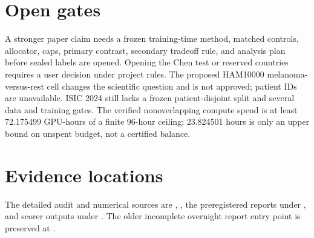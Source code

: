 \documentclass[11pt,a4paper]{article}
\begin{document}
\section{Open gates}
A stronger paper claim needs a frozen training-time method, matched
controls, allocator, caps, primary contrast, secondary tradeoff rule,
and analysis plan before sealed labels are opened. Opening the Chen
test or reserved countries requires a user decision under project rules.
The proposed HAM10000 melanoma-versus-rest cell changes the scientific
question and is not approved; patient IDs are unavailable. ISIC 2024
still lacks a frozen patient-disjoint split and several data and
training gates. The verified nonoverlapping compute spend is at least
72.175499 GPU-hours of a finite 96-hour ceiling; 23.824501 hours is
only an upper bound on unspent budget, not a certified balance.

\section{Evidence locations}
The detailed audit and numerical sources are
,
,
the preregistered reports under , and scorer
outputs under . The older incomplete overnight
report entry point is preserved at
.
\end{document}
